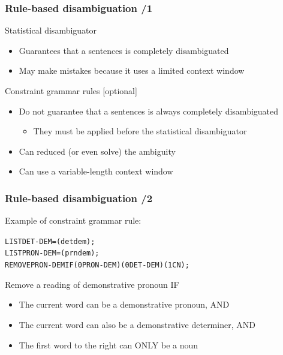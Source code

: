 \documentclass{beamer} %
\begin{document}
\begin{frame}
  \frametitle{Rule-based disambiguation /1}

  \begin{block}{Statistical disambiguator}
    \begin{itemize}
    \item Guarantees that a sentences is completely disambiguated
    \item May make mistakes because it uses a \alert{limited context window}
    \end{itemize}
  \end{block}

  \begin{block}{Constraint grammar rules [optional]}
    \begin{itemize}
    \item Do not guarantee that a sentences is always completely
      disambiguated
      \begin{itemize}
      \item They must be applied before the statistical
        disambiguator
      \end{itemize}
    \item Can reduced (or even solve) the ambiguity
    \item Can use a \alert{variable-length context window}
    \end{itemize}
  \end{block}
\end{frame}

\begin{frame}
  \frametitle{Rule-based disambiguation /2}

  \begin{exampleblock}{Example of constraint grammar rule:}
    \begin{small}
    \begin{alltt}
       LIST DET-DEM = (det dem);\\
       LIST PRON-DEM = (prn dem);\\

       REMOVE PRON-DEM IF (0 PRON-DEM) (0 DET-DEM) (1C N);
    \end{alltt}
    \end{small}
  \end{exampleblock}

  \begin{block}{}
    Remove a reading of demonstrative pronoun IF
    \begin{itemize}
    \item The current word can be a demonstrative pronoun, AND
    \item The current word can also be a demonstrative determiner, AND
    \item The first word to the right can ONLY be a noun
    \end{itemize}
  \end{block}
\end{frame}
\end{document}
